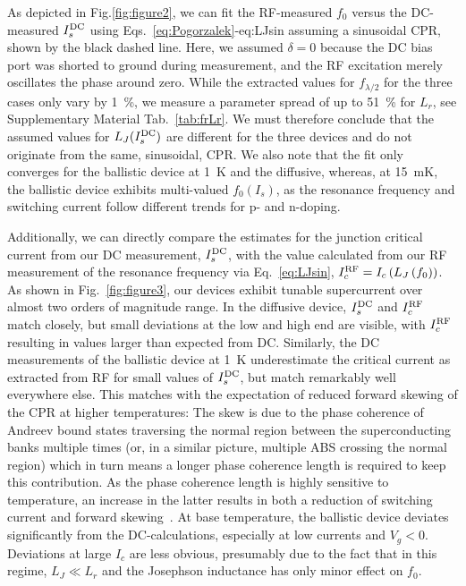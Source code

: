 As depicted in Fig.\ref{fig:figure2}, we can fit the RF-measured $f_0$ versus the DC-measured $I_s^{\rm DC}$ using Eqs.~\ref{eq:Pogorzalek}-{eq:LJsin} assuming a sinusoidal CPR, shown by the black dashed line.
%
Here, we assumed $\delta=0$ because the DC bias port was shorted to ground during measurement, and the RF excitation merely oscillates the phase around zero.
%
While the extracted values for $f_{\lambda/2}$ for the three cases only vary by \SI{1}{\percent}, we measure a parameter spread of up to \SI{51}{\percent} for $L_r$, see Supplementary Material Tab.~\ref{tab:frLr}.
%
We must therefore conclude that the assumed values for $L_J(I_s^{\rm DC})$ are different for the three devices and do not originate from the same, sinusoidal, CPR.
%
We also note that the fit only converges for the ballistic device at \SI{1}{\kelvin} and the diffusive, whereas, at \SI{15}{\milli\kelvin}, the ballistic device exhibits multi-valued $f_0\left(I_s\right)$, as the resonance frequency and switching current follow different trends for p- and n-doping.

Additionally, we can directly compare the estimates for the junction critical current from our DC measurement, $I_s^{\rm DC}$, with the value calculated from our RF measurement of the resonance frequency via Eq.~\ref{eq:LJsin}, $I_c^{\rm RF}=I_c\left(L_J\left(f_0\right)\right)$. 
%
As shown in Fig.~\ref{fig:figure3}, our devices exhibit tunable supercurrent over almost two orders of magnitude range.
%
In the diffusive device, $I_s^{\rm DC}$ and $I_c^{\rm RF}$ match closely, but small deviations at the low and high end are visible, with $I_c^{\rm RF}$ resulting in values larger than expected from DC.
%
Similarly, the DC measurements of the ballistic device at \SI{1}{\kelvin} underestimate the critical current as extracted from RF for small values of $I_s^{\rm DC}$, but match remarkably well everywhere else.
%
This matches with the expectation of reduced forward skewing of the CPR at higher temperatures:
%
The skew is due to the phase coherence of Andreev bound states traversing the normal region between the superconducting banks multiple times (or, in a similar picture, multiple ABS crossing the normal region) which in turn means a longer phase coherence length is required to keep this contribution.
%
As the phase coherence length is highly sensitive to temperature, an increase in the latter results in both a reduction of switching current and forward skewing~\cite{fuechsleEffectMicrowavesCurrentPhase2009,hagymasiJosephsonCurrentBallistic2010,black-schafferStronglyAnharmonicCurrentphase2010,rakytaMagneticFieldOscillations2016,englishObservationNonsinusoidalCurrentphase2016}.
%
At base temperature, the ballistic device deviates significantly from the DC-calculations, especially at low currents and $V_g<0$.
%
Deviations at large $I_c$ are less obvious, presumably due to the fact that in this regime, $L_J \ll L_r$ and the Josephson inductance has only minor effect on $f_0$.

